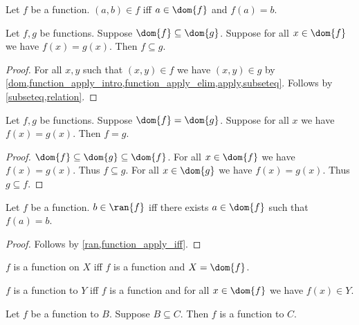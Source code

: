 \begin{proposition}\label{function_apply_iff}
    Let $f$ be a function.
    $(a,b)\in f$ iff $a\in\dom{f}$ and $f(a) = b$.
\end{proposition}

\begin{proposition}\label{fun_subseteq}
    Let $f, g$ be functions.
    Suppose $\dom{f}\subseteq \dom{g}$.
    Suppose for all $x\in\dom{f}$ we have $f(x) = g(x)$.
    Then $f\subseteq g$.
\end{proposition}
\begin{proof}
    For all $x,y$ such that $(x,y)\in f$ we have $(x,y)\in g$ by \cref{dom,function_apply_intro,function_apply_elim,apply,subseteq}.
    Follows by \cref{subseteq,relation}.
\end{proof}

\begin{proposition}\label{funext}
    Let $f, g$ be functions.
    Suppose $\dom{f} = \dom{g}$.
    Suppose for all $x$ we have  $f(x) = g(x)$.
    Then $f = g$.
\end{proposition}
\begin{proof}
    $\dom{f}\subseteq \dom{g}\subseteq \dom{f}$.
    For all $x\in\dom{f}$ we have $f(x) = g(x)$.
    Thus $f\subseteq g$.
    For all $x\in\dom{g}$ we have $f(x) = g(x)$.
    Thus $g\subseteq f$.
\end{proof}

\begin{proposition}\label{fun_ran_iff}
    Let $f$ be a function.
    $b\in\ran{f}$ iff there exists $a\in\dom{f}$ such that $f(a) = b$.
\end{proposition}
\begin{proof}
    Follows by \cref{ran,function_apply_iff}.
\end{proof}

\begin{abbreviation}\label{function_on}
    $f$ is a function on $X$ iff $f$ is a function and $X = \dom{f}$.
\end{abbreviation}

\begin{abbreviation}\label{function_to}
    $f$ is a function to $Y$ iff $f$ is a function and for all $x\in\dom{f}$ we have $f(x)\in Y$.
\end{abbreviation}

\begin{proposition}\label{function_on_weaken_codom}
    Let $f$ be a function to $B$.
    Suppose $B\subseteq C$.
    Then $f$ is a function to $C$.
\end{proposition}

